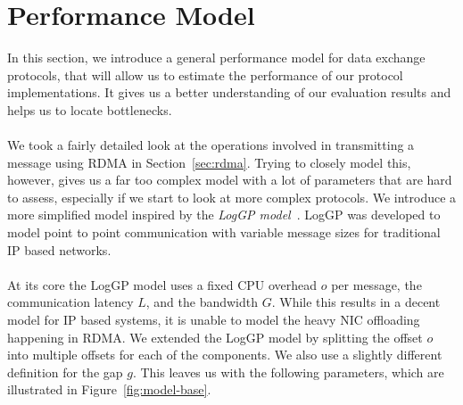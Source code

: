 \section{Performance Model}\label{sec:perf-model} \label{sec:model}
  In this section, we introduce a general performance model for data exchange protocols, that will allow us to estimate the 
performance of our protocol implementations. It gives us a better understanding of our evaluation results and helps us 
to locate bottlenecks.

\paragraph{}We took a fairly detailed look at the operations involved in transmitting a message using RDMA in Section~\ref{sec:rdma}.
Trying to closely model this, however, gives us a far too complex model with a lot of parameters that are hard to assess,
especially if we start to look at more complex protocols. We introduce a more simplified model inspired by the  
\emph{LogGP model}~\cite{loggp}. LogGP was developed  to model point to point communication with variable message sizes for 
traditional IP based networks.

\paragraph{} At its core the LogGP model uses a fixed CPU overhead $o$ per message, the communication latency $L$, and 
the bandwidth $G$. While this results in a decent model for IP based systems, it is unable to model the heavy NIC offloading 
happening in RDMA. We extended the LogGP model by splitting the offset $o$ into multiple offsets for each of the components.
We also use a slightly different definition for the gap $g$. This leaves 
us with the following parameters, which are illustrated in Figure~\ref{fig:model-base}.

